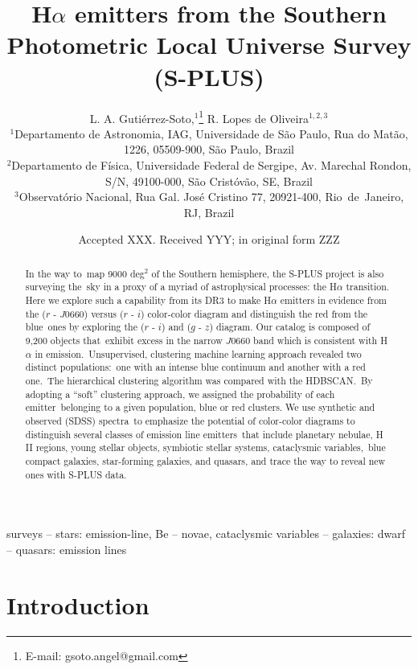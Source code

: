 \documentclass[fleqn,usenatbib]{mnras}
\title[S-PLUS: H$\alpha$ emitters]{H$\alpha$ emitters from the Southern Photometric Local Universe Survey (S-PLUS)}
\author[Guti\'{e}rrez-Soto et al.]{
L. A. Guti\'{e}rrez-Soto,$^{1}$\thanks{E-mail: gsoto.angel@gmail.com}
R. Lopes de Oliveira$^{1,2,3}$
\\
$^{1}$Departamento de Astronomia, IAG, Universidade de S\~{a}o Paulo, Rua do Mat\~{a}o,
1226, 05509-900, S\~{a}o Paulo, Brazil\\
$^{2}$Departamento de F\'isica, Universidade Federal de Sergipe, Av. Marechal Rondon, S/N, 49100-000, S\~ao Crist\'ov\~ao, SE, Brazil\\
$^{3}$Observat\'orio Nacional, Rua Gal. Jos\'e Cristino 77, 20921-400, Rio~de~Janeiro, RJ, Brazil\\
}
\date{Accepted XXX. Received YYY; in original form ZZZ}
\begin{document}
\label{firstpage}
\pagerange{\pageref{firstpage}--\pageref{lastpage}}
\maketitle

\begin{abstract}

In the way to map 9000 deg$^2$ of the Southern hemisphere, the S-PLUS project is also surveying the sky in a proxy of a myriad of astrophysical processes: the H$\alpha$ transition. Here we explore such a capability from its DR3 to make H$\alpha$ emitters in evidence from 
the ($r$ - $J$0660) versus ($r$ - $i$) color-color diagram and distinguish the red from the blue ones by exploring the ($r$ - $i$) and ($g$ - $z$) diagram. Our catalog is composed of 9,200 objects that exhibit excess in the narrow $J$0660 band which is consistent with H{$\alpha$} in emission. Unsupervised, clustering machine learning approach revealed two distinct populations: one with an intense blue continuum and another with a red one. The hierarchical clustering algorithm was compared with the HDBSCAN. By adopting a ``soft'' clustering approach, we assigned the probability of each emitter belonging to a given population, blue or red clusters. We use synthetic and observed (SDSS) spectra to emphasize the potential of color-color diagrams to distinguish several classes of emission line emitters that include planetary nebulae, H II regions, young stellar objects, symbiotic stellar systems, cataclysmic variables, blue compact galaxies, star-forming galaxies, and quasars, and trace the way to reveal new ones with S-PLUS data.

\end{abstract}
\begin{keywords}
  surveys -- stars: emission-line, Be -- novae, cataclysmic variables
  -- galaxies: dwarf -- quasars: emission lines
\end{keywords}



\section{Introduction}
\end{document}
